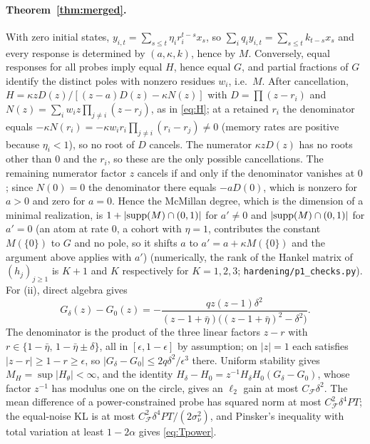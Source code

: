 \documentclass[12pt]{article}
\theoremstyle{definition}
\theoremstyle{remark}
\begin{document}
\paragraph{Theorem~\ref{thm:merged}.} With zero initial states, $y_{i,t}=\sum_{s\le t}\eta_ir_i^{t-s}x_s$, so $\sum_iq_iy_{i,t}=\sum_{s\le t}k_{t-s}x_s$ and every response is determined by $(a,\kappa,k)$, hence by $M$. Conversely, equal responses for all probes imply equal $H$, hence equal $G$, and partial fractions of $G$ identify the distinct poles with nonzero residues $w_i$, i.e.\ $M$. After cancellation, $H=\kappa zD(z)/[(z-a)D(z)-\kappa N(z)]$ with $D=\prod(z-r_i)$ and $N(z)=\sum_iw_iz\prod_{j\ne i}(z-r_j)$, as in \eqref{eq:H}; at a retained $r_i$ the denominator equals $-\kappa N(r_i)=-\kappa w_ir_i\prod_{j\ne i}(r_i-r_j)\neq0$ (memory rates are positive because $\eta_i<1$), so no root of $D$ cancels. The numerator $\kappa zD(z)$ has no roots other than $0$ and the $r_i$, so these are the only possible cancellations. The remaining numerator factor $z$ cancels if and only if the denominator vanishes at $0$; since $N(0)=0$ the denominator there equals $-aD(0)$, which is nonzero for $a>0$ and zero for $a=0$. Hence the McMillan degree, which is the dimension of a minimal realization, is $1+|{\rm supp}(M)\cap(0,1)|$ for $a'\neq0$ and $|{\rm supp}(M)\cap(0,1)|$ for $a'=0$ (an atom at rate $0$, a cohort with $\eta=1$, contributes the constant $M(\{0\})$ to $G$ and no pole, so it shifts $a$ to $a'=a+\kappa M(\{0\})$ and the argument above applies with $a'$) (numerically, the rank of the Hankel matrix of $(h_j)_{j\ge1}$ is $K+1$ and $K$ respectively for $K=1,2,3$; \texttt{hardening/p1\_checks.py}). For (ii), direct algebra gives
\[
G_\delta(z)-G_0(z)=-\frac{qz(z-1)\delta^2}{(z-1+\bar\eta)\bigl((z-1+\bar\eta)^2-\delta^2\bigr)} .
\]
The denominator is the product of the three linear factors $z-r$ with $r\in\{1-\bar\eta,\,1-\bar\eta\pm\delta\}$, all in $[\epsilon,1-\epsilon]$ by assumption; on $|z|=1$ each satisfies $|z-r|\ge1-r\ge\epsilon$, so $|G_\delta-G_0|\le2q\delta^2/\epsilon^3$ there. Uniform stability gives $M_H=\sup|H_\theta|<\infty$, and the identity $H_\delta-H_0=z^{-1}H_\delta H_0(G_\delta-G_0)$, whose factor $z^{-1}$ has modulus one on the circle, gives an $\ell_2$ gain at most $C_{\mathcal F}\delta^2$. The mean difference of a power-constrained probe has squared norm at most $C_{\mathcal F}^2\delta^4PT$; the equal-noise KL is at most $C_{\mathcal F}^2\delta^4PT/(2\sigma_\nu^2)$, and Pinsker's inequality with total variation at least $1-2\alpha$ gives \eqref{eq:Tpower}.
\end{document}
